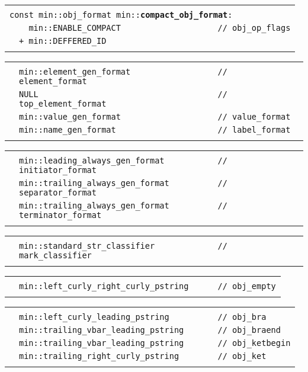 \documentclass[12pt]{article}
\makeatletter
\newcommand{\TT}[1]{{\tt \bfseries #1}}
\newcommand{\ttindex}[1]{\index{#1@{\tt #1}}}
\newenvironment{indpar}[1][0.3in]%
	{\begin{list}{}%
		     {\setlength{\itemsep}{0in}%
		      \setlength{\topsep}{0in}%
		      \setlength{\parsep}{1ex}%
		      \setlength{\labelwidth}{#1}%
		      \setlength{\leftmargin}{#1}%
		      \addtolength{\leftmargin}{\labelsep}}%
	 \item}%
	{\end{list}}
\newcommand{\LABEL}[1]{\label{#1}}
\newlength{\ARGBREAKLENGTH}
\newcommand{\ARGBREAK}[1][\ARGBREAKLENGTH]{\\&\hspace*{#1}}
\newcommand{\MINKEY}[1]%
	   {\TT{#1}\ttindex{min::#1}\ttindex{#1}}
\makeatother
\begin{document}
\begin{indpar}[1em]

\begin{tabular}{r@{}l}\hspace*{0.1in} \\[-3ex]
\multicolumn{2}{l}{\tt const min::obj\_format
                   min::\MINKEY{compact\_obj\_format}:}%
\LABEL{MIN::COMPACT_OBJ_FORMAT}\ARGBREAK
\verb|  min::ENABLE_COMPACT                    // obj_op_flags|\ARGBREAK
\verb|+ min::DEFFERED_ID|\ARGBREAK
\end{tabular}

\vspace{-4ex}\begin{tabular}{r@{}l}\hspace*{0.1in}\ARGBREAK
\verb|min::element_gen_format                  // element_format|\ARGBREAK
\verb|NULL                                     // top_element_format|\ARGBREAK
\verb|min::value_gen_format                    // value_format|\ARGBREAK
\verb|min::name_gen_format                     // label_format|\ARGBREAK
\end{tabular}

\vspace{-4ex}\begin{tabular}{r@{}l}\hspace*{0.1in}\ARGBREAK
\verb|min::leading_always_gen_format           // initiator_format|\ARGBREAK
\verb|min::trailing_always_gen_format          // separator_format|\ARGBREAK
\verb|min::trailing_always_gen_format          // terminator_format|\ARGBREAK
\end{tabular}

\vspace{-4ex}\begin{tabular}{r@{}l}\hspace*{0.1in}\ARGBREAK
\verb|min::standard_str_classifier             // mark_classifier|\ARGBREAK
\end{tabular}

\vspace{-4ex}\begin{tabular}{r@{}l}\hspace*{0.1in}\ARGBREAK
\verb|min::left_curly_right_curly_pstring      // obj_empty|\ARGBREAK
\end{tabular}

\vspace{-4ex}\begin{tabular}{r@{}l}\hspace*{0.1in}\ARGBREAK
\verb|min::left_curly_leading_pstring          // obj_bra|\ARGBREAK
\verb|min::trailing_vbar_leading_pstring       // obj_braend|\ARGBREAK
\verb|min::trailing_vbar_leading_pstring       // obj_ketbegin|\ARGBREAK
\verb|min::trailing_right_curly_pstring        // obj_ket|\ARGBREAK
\end{tabular}


\end{indpar}
\end{document}
